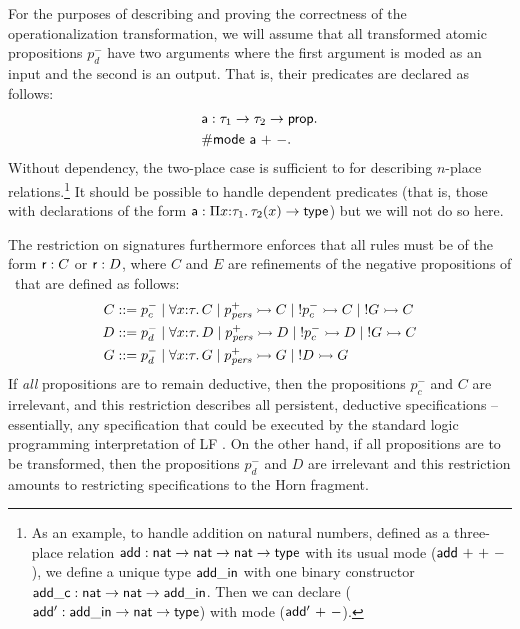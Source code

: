 For the purposes of describing and proving the correctness of the
operationalization transformation, we will assume that all transformed
atomic propositions $p_d^-$ have two arguments where the first
argument is moded as an input and the second is an output. That is,
their predicates are declared as follows:
\begin{align*}
& {\sf a} : \tau_1 \rightarrow \tau_2 \rightarrow {\sf prop}.\\
& {\sf \#mode~a~{+}~{-}}.
\end{align*}
Without dependency, the two-place case is sufficient to for
describing $n$-place relations.\footnote{As an example, to handle
  addition on natural numbers, defined as a three-place relation ${\sf
    add} : {\sf nat} \rightarrow {\sf nat} \rightarrow {\sf nat}
  \rightarrow {\sf type}$ with its usual mode (${\sf
    add}~{+}~{+}~{-}$), we define a unique type ${\sf add\_in}$ with
  one binary constructor ${\sf add\_c} : {\sf nat} \rightarrow {\sf
    nat} \rightarrow {\sf add\_in}$. Then we can declare (${\sf add'}
  : {\sf add\_in} \rightarrow {\sf nat} \rightarrow {\sf type}$) with
  mode (${\sf add'}~{+}~{-}$).}  It should be possible to handle
dependent predicates (that is, those with declarations of the form
${\sf a} : \Pi x{:}\tau_1.\,\tau_2(x) \rightarrow {\sf type}$) but we
will not do so here.

The restriction on signatures furthermore enforces that all rules must
be of the form ${\sf r} : C$ or ${\sf r} : D$, where $C$ and $E$ are
refinements of the negative propositions of \sls~that are defined as
follows:
\begin{align*}
C & ::= p^-_{c} 
    \mid \forall x{:}\tau.\, C
    \mid p^+_{\it pers} \rightarrowtail C
    \mid {!}p^-_c \rightarrowtail C
    \mid {!}G \rightarrowtail C \\
D & ::= p^-_{d}
    \mid \forall x{:}\tau.\, D
    \mid p^+_{\it pers} \rightarrowtail D
    \mid {!}p^-_c \rightarrowtail D
    \mid {!}G \rightarrowtail C \\
G & ::= p^-_d 
    \mid \forall x{:}\tau.\, G
    \mid p^+_{\it pers} \rightarrowtail G
    \mid {!}D \rightarrowtail G
\end{align*}
If {\it all} propositions are to remain deductive, then the
propositions $p^-_c$ and $C$ are irrelevant, and this restriction
describes all persistent, deductive specifications -- essentially, any
specification that could be executed by the standard logic programming
interpretation of LF \cite{pfenning98elf}. On the other hand, if all
propositions are to be transformed, then the propositions $p^-_d$ and
$D$ are irrelevant and this restriction amounts to restricting
specifications to the Horn fragment.

